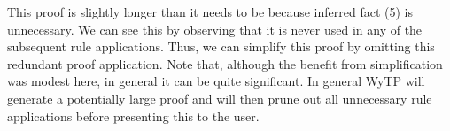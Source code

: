 This proof is slightly longer than it needs to be because inferred
fact (5) is unnecessary.  We can see this by observing that it is
never used in any of the subsequent rule applications.  Thus, we can
simplify this proof by omitting this redundant proof application.
Note that, although the benefit from simplification was modest here,
in general it can be quite significant.  In general WyTP will generate
a potentially large proof and will then prune out all unnecessary rule
applications before presenting this to the user.

